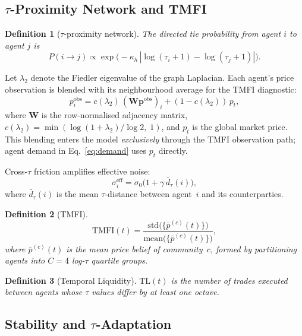 \documentclass[preprint,12pt,authoryear]{elsarticle}
\newtheorem{definition}{Definition}
\begin{document}
\subsection{$\tau$-Proximity Network and TMFI}

\begin{definition}[$\tau$-proximity network]
The directed tie probability from agent $i$ to agent $j$ is
\[
  P(i \to j) \propto
  \exp\!\bigl(-\kappa_h\,|\log(\tau_i+1)-\log(\tau_j+1)|\bigr).
\]
\end{definition}

Let $\lambda_2$ denote the Fiedler eigenvalue of the graph Laplacian.
Each agent's price observation is blended with its neighbourhood average
for the TMFI diagnostic:
\begin{equation}
  p^{\mathrm{obs}}_i
    = c(\lambda_2)\,(\mathbf{W}\mathbf{p}^{\mathrm{obs}})_i
    + (1-c(\lambda_2))\,p_t,
  \label{eq:pobs}
\end{equation}
where $\mathbf{W}$ is the row-normalised adjacency matrix,
$c(\lambda_2) = \min(\log(1+\lambda_2)/\log 2,\;1)$,
and $p_t$ is the global market price.
This blending enters the model \emph{exclusively} through the TMFI
observation path; agent demand in Eq.~\eqref{eq:demand} uses $p_t$
directly.

Cross-$\tau$ friction amplifies effective noise:
\begin{equation}
  \sigma_i^{\mathrm{eff}} = \sigma_0\bigl(1 + \gamma\,\bar{d}_\tau(i)\bigr),
  \label{eq:sigeff}
\end{equation}
where $\bar{d}_\tau(i)$ is the mean $\tau$-distance between agent~$i$ and
its counterparties.

\begin{definition}[TMFI]
\[
  \mathrm{TMFI}(t) =
    \frac{\mathrm{std}\bigl(\{\bar{p}^{(c)}(t)\}\bigr)}%
         {\mathrm{mean}\bigl(\{\bar{p}^{(c)}(t)\}\bigr)},
\]
where $\bar{p}^{(c)}(t)$ is the mean price belief of community~$c$,
formed by partitioning agents into $C = 4$ log-$\tau$ quartile groups.
\end{definition}

\begin{definition}[Temporal Liquidity]
$\mathrm{TL}(t)$ is the number of trades executed between agents
whose $\tau$ values differ by at least one octave.
\end{definition}

\subsection{Stability and $\tau$-Adaptation}
\end{document}
